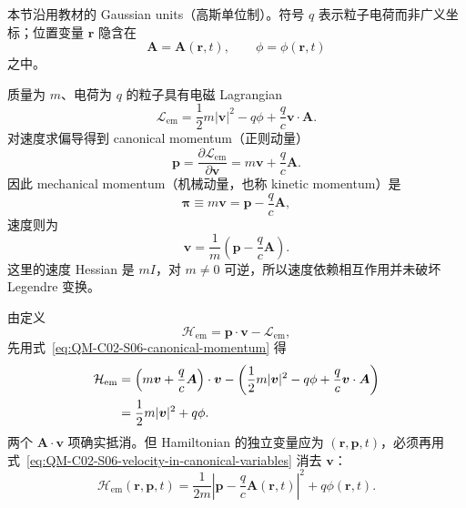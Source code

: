 本节沿用教材的 Gaussian units（高斯单位制）。符号 $q$ 表示粒子电荷而非广义坐标；位置变量 $\bm r$ 隐含在
\[
  \bm A=\bm A(\bm r,t),
  \qquad
  \phi=\phi(\bm r,t)
\]
之中。


质量为 $m$、电荷为 $q$ 的粒子具有电磁 Lagrangian
\begin{equation}
  \boxed{
  \mathcal L_{\mathrm{em}}
  =\frac12m|\bm v|^2-q\phi
  +\frac qc\bm v\cdot\bm A.}
  \label{eq:QM-C02-S06-em-lagrangian}
\end{equation}
对速度求偏导得到 canonical momentum（正则动量）
\begin{equation}
  \boxed{
  \bm p
  =\frac{\partial\mathcal L_{\mathrm{em}}}{\partial\bm v}
  =m\bm v+\frac qc\bm A.}
  \label{eq:QM-C02-S06-canonical-momentum}
\end{equation}
因此 mechanical momentum（机械动量，也称 kinetic momentum）是
\begin{equation}
  \boxed{
  \bm\pi\equiv m\bm v
  =\bm p-\frac qc\bm A,}
  \label{eq:QM-C02-S06-mechanical-momentum}
\end{equation}
速度则为
\begin{equation}
  \bm v
  =\frac1m\left(\bm p-\frac qc\bm A\right).
  \label{eq:QM-C02-S06-velocity-in-canonical-variables}
\end{equation}
这里的速度 Hessian 是 $mI$，对 $m\neq0$ 可逆，所以速度依赖相互作用并未破坏 Legendre 变换。

由定义
\[
  \mathcal H_{\mathrm{em}}
  =\bm p\cdot\bm v-\mathcal L_{\mathrm{em}},
\]
先用式~\eqref{eq:QM-C02-S06-canonical-momentum} 得
\begin{align}
  \mathcal H_{\mathrm{em}}
  &=
  \left(m\bm v+\frac qc\bm A\right)\cdot\bm v
  -\left(
    \frac12m|\bm v|^2-q\phi
    +\frac qc\bm v\cdot\bm A
  \right) \notag\\
  &=\frac12m|\bm v|^2+q\phi.
  \label{eq:QM-C02-S06-hamiltonian-velocity-form}
\end{align}
两个 $\bm A\cdot\bm v$ 项确实抵消。但 Hamiltonian 的独立变量应为 $(\bm r,\bm p,t)$，必须再用式~\eqref{eq:QM-C02-S06-velocity-in-canonical-variables} 消去 $\bm v$：
\begin{equation}
  \boxed{
  \mathcal H_{\mathrm{em}}(\bm r,\bm p,t)
  =
  \frac1{2m}
  \left|
    \bm p-\frac qc\bm A(\bm r,t)
  \right|^2
  +q\phi(\bm r,t).}
  \label{eq:QM-C02-S06-em-hamiltonian}
\end{equation}


